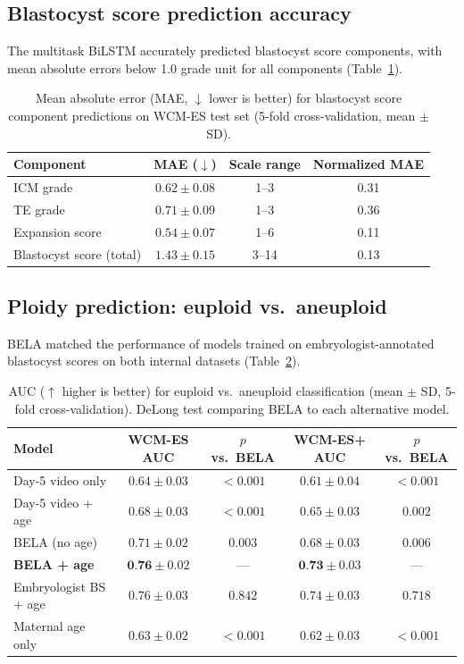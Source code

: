 \documentclass[11pt]{article}
\begin{document}
\subsection{Blastocyst score prediction accuracy}

The multitask BiLSTM accurately predicted blastocyst score components, with mean absolute errors below 1.0 grade unit for all components (Table~\ref{tab:mae}).

\begin{table}[H]
\centering
\caption{Mean absolute error (MAE, $\downarrow$ lower is better) for blastocyst score component predictions on WCM-ES test set (5-fold cross-validation, mean $\pm$ SD).}
\label{tab:mae}
\begin{tabular}{lccc}
\toprule
\textbf{Component} & \textbf{MAE ($\downarrow$)} & \textbf{Scale range} & \textbf{Normalized MAE} \\
\midrule
ICM grade & $0.62 \pm 0.08$ & 1--3 & 0.31 \\
TE grade & $0.71 \pm 0.09$ & 1--3 & 0.36 \\
Expansion score & $0.54 \pm 0.07$ & 1--6 & 0.11 \\
Blastocyst score (total) & $1.43 \pm 0.15$ & 3--14 & 0.13 \\
\bottomrule
\end{tabular}
\end{table}

\subsection{Ploidy prediction: euploid vs.\ aneuploid}

BELA matched the performance of models trained on embryologist-annotated blastocyst scores on both internal datasets (Table~\ref{tab:eup_anu}).

\begin{table}[H]
\centering
\caption{AUC ($\uparrow$ higher is better) for euploid vs.\ aneuploid classification (mean $\pm$ SD, 5-fold cross-validation). DeLong test comparing BELA to each alternative model.}
\label{tab:eup_anu}
\begin{tabular}{lcccc}
\toprule
\textbf{Model} & \textbf{WCM-ES AUC} & \textbf{$p$ vs.\ BELA} & \textbf{WCM-ES+ AUC} & \textbf{$p$ vs.\ BELA} \\
\midrule
Day-5 video only & $0.64 \pm 0.03$ & $< 0.001$ & $0.61 \pm 0.04$ & $< 0.001$ \\
Day-5 video + age & $0.68 \pm 0.03$ & $< 0.001$ & $0.65 \pm 0.03$ & $0.002$ \\
BELA (no age) & $0.71 \pm 0.02$ & $0.003$ & $0.68 \pm 0.03$ & $0.006$ \\
\textbf{BELA + age} & $\textbf{0.76} \pm 0.02$ & --- & $\textbf{0.73} \pm 0.03$ & --- \\
Embryologist BS + age & $0.76 \pm 0.03$ & $0.842$ & $0.74 \pm 0.03$ & $0.718$ \\
Maternal age only & $0.63 \pm 0.02$ & $< 0.001$ & $0.62 \pm 0.03$ & $< 0.001$ \\
\bottomrule
\end{tabular}
\end{table}
\end{document}

